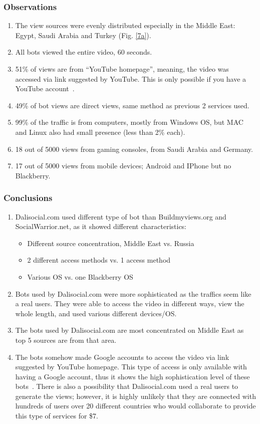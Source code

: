 \documentclass[conference]{IEEEtran}
\begin{document}
\subsubsection*{Observations}

\begin{enumerate}
  \item The view sources were evenly distributed especially in the Middle East: Egypt, Saudi Arabia and Turkey (Fig. \ref{7a}).
  \item All bots viewed the entire video, 60 seconds.
  \item 51\% of views are from “YouTube homepage”, meaning, the video was accessed via link suggested by YouTube.  This is only possible if you have a YouTube account~\cite{c21}.
  \item 49\% of bot views are direct views, same method as previous 2 services used.
  \item 99\% of the traffic is from computers, mostly from Windows OS, but MAC and Linux also had small presence (less than 2\% each).
  \item 18 out of 5000 views from gaming consoles, from Saudi Arabia and Germany.
  \item 17 out of 5000 views from mobile devices; Android and IPhone but no Blackberry.
\end{enumerate}

\subsubsection*{Conclusions}

\begin{enumerate}
  \item Dalisocial.com used different type of bot than Buildmyviews.org and SocialWarrior.net, as it showed different characteristics:
  \begin{itemize}
    \item Different source concentration, Middle East vs. Russia
    \item 2 different access methods vs. 1 access method
    \item Various OS vs. one Blackberry OS
  \end{itemize}
  \item Bots used by Dalisocial.com were more sophisticated as the traffics seem like a real users. They were able to access the video in different ways, view the whole length, and used various different devices/OS.
  \item The bots used by Dalisocial.com are most concentrated on Middle East as top 5 sources are from that area.
  \item The bots somehow made Google accounts to access the video via link suggested by YouTube homepage. This type of access is only available with having a Google account, thus it shows the high sophistication level of these bots~\cite{c21}. There is also a possibility that Dalisocial.com used a real users to generate the views; however, it is highly unlikely that they are connected with hundreds of users over 20 different countries who would collaborate to provide this type of services for \$7.
\end{enumerate}
\end{document}
